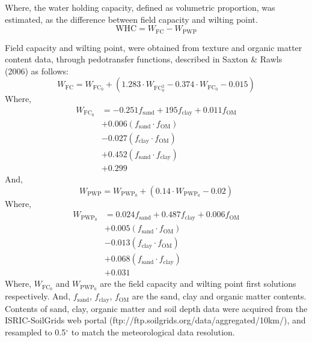 \documentclass{myreport}
\begin{document}
Where, the water holding capacity, defined as volumetric proportion, was estimated, as the difference between field capacity and wilting point.
\begin{equation}
\text{WHC}=W_{\text{FC}}-W_{\text{PWP}}
\end{equation}

Field capacity and wilting point, were obtained from texture and organic matter content data, through pedotransfer functions, described in Saxton \& Rawls (2006) as follows:
\begin{equation}
W_{\text{FC}}= W_{\text{FC}}_{0}+(1.283\cdot W_{\text{FC}}_{0}^{2}-0.374\cdot W_{\text{FC}}_{0}-0.015)
\end{equation}
Where,
\begin{align}
W_{\text{FC}}_{0} &=-0.251f_{\text{sand}}+195f_{\text{clay}}+0.011f_{\text{OM}}\\                            &+0.006(f_{\text{sand}}\cdot f_{\text{OM}})\\
                  &-0.027(f_{\text{clay}}\cdot f_{\text{OM}})\\
                  &+0.452 (f_{\text{sand}}\cdot f_{\text{clay}})\\
                  &+0.299
\end{align}
And,
\begin{equation}
W_{\text{PWP}}=W_{\text{PWP}}_{0}+(0.14\cdot W_{\text{PWP}}_{0}-0.02)
\end{equation}
Where,
\begin{align}
W_{\text{PWP}}_{0} &=0.024 f_{\text{sand}} + 0.487 f_{\text{clay}} + 0.006 f_{\text{OM}} \\
                  &+0.005 ( f_{\text{sand}}\cdot f_{\text{OM}} )\\
                  &-0.013( f_{\text{clay}}\cdot f_{\text{OM}} )\\
                  &+0.068( f_{\text{sand}} \cdot f_{\text{clay}} )\\
                  &+0.031
\end{align}
Where, $W_{\text{FC}}_{0}$ and $W_{\text{PWP}}_{0}$ are the field capacity and wilting point first solutions respectively. And, $f_{\text{sand}}$, $f_{\text{clay}}$, $f_{\text{OM}}$ are the sand, clay and organic matter contents.
Contents of sand, clay, organic matter and soil depth data were acquired from the ISRIC-SoilGrids web portal (ftp://ftp.soilgrids.org/data/aggregated/10km/), and resampled to 0.5$^{\circ}$ to match the meteorological data resolution.
\end{document}
